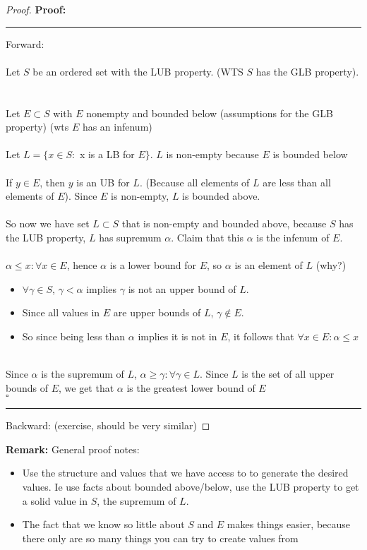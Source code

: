 \documentclass{article}
\newcommand{\qed}{\null\nobreak\hfill\ensuremath{\square}}
\begin{document}
\begin{proof} 
\textbf{Proof:} \\
\hrule
\bigskip
Forward: \\
~\\
Let $S$ be an ordered set with the LUB property. (WTS $S$ has the GLB property). ~\\
~\\
Let $E\subset S$ with $E$ nonempty and bounded below (assumptions for the GLB property) (wts $E$ has an infenum) \\
~\\
Let $L = \{x\in S: $ x is a LB for $E \}$. $L$ is non-empty because $E$ is bounded below \\
~\\
If $y\in E$, then $y$ is an UB for $L$. (Because all elements of $L$ are less than all elements of $E$). Since $E$ is non-empty, $L$ is bounded above. ~\\
~\\
So now we have set $L\subset S$ that is non-empty and bounded above, because $S$ has the LUB property, $L$ has supremum $\alpha$. Claim that this $\alpha$ is the infenum of $E$. \\
~\\
$\alpha \le x : \forall x\in E$, hence $\alpha$ is a lower bound for $E$, so $\alpha$ is an element of $L$ (why?) \\
\begin{itemize}
	\item $\forall \gamma\in S$, $\gamma < \alpha$ implies $\gamma$ is not an upper bound of $L$. 
	\item Since all values in $E$ are upper bounds of $L$, $\gamma\notin E$.
	\item So since being less than $\alpha$ implies it is not in $E$, it follows that $\forall x\in E: \alpha \le x$
\end{itemize}
~\\
Since $\alpha$ is the supremum of $L$, $\alpha \ge \gamma: \forall \gamma\in L$. Since $L$ is the set of all upper bounds of $E$, we get that $\alpha$ is the greatest lower bound of $E$ \\
\qed
\bigskip
\hrule
\bigskip
Backward: (exercise, should be very similar)
\end{proof}
\begin{remark} 
\textbf{Remark:} General proof notes:
\begin{itemize}
	\item Use the structure and values that we have access to to generate the desired values. Ie use facts about bounded above/below, use the LUB property to get a solid value in $S$, the supremum of $L$. 
	\item The fact that we know so little about $S$ and $E$ makes things easier, because there only are so many things you can try to create values from
\end{itemize}
\end{remark}
\end{document}
